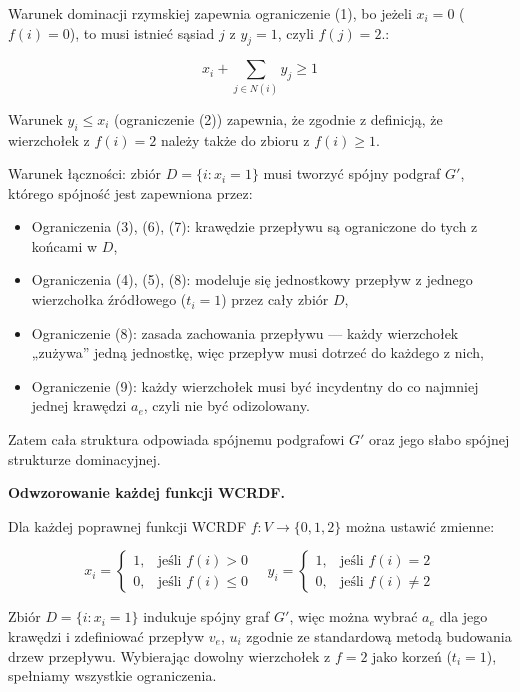 Warunek dominacji rzymskiej zapewnia ograniczenie (1), bo jeżeli \( x_i = 0 \) (\( f(i) = 0 \)), to musi istnieć sąsiad \( j \) z \( y_j = 1 \), czyli \( f(j) = 2 \).:

\[
x_i + \sum_{j \in N(i)} y_j \geq 1
\]

Warunek \( y_i \leq x_i \) (ograniczenie (2)) zapewnia, że zgodnie z definicją, że wierzchołek z \( f(i) = 2 \) należy także do zbioru z \( f(i) \geq 1 \).

Warunek łączności: zbiór \( D = \{i : x_i = 1\} \) musi tworzyć spójny podgraf \( G' \), którego spójność jest zapewniona przez:

\begin{itemize}
    \item Ograniczenia (3), (6), (7): krawędzie przepływu są ograniczone do tych z końcami w \( D \),
    \item Ograniczenia (4), (5), (8): modeluje się jednostkowy przepływ z jednego wierzchołka źródłowego ($t_i = 1$) przez cały zbiór \( D \),
    \item Ograniczenie (8): zasada zachowania przepływu — każdy wierzchołek „zużywa” jedną jednostkę, więc przepływ musi dotrzeć do każdego z nich,
    \item Ograniczenie (9): każdy wierzchołek musi być incydentny do co najmniej jednej krawędzi $a_e$, czyli nie być odizolowany.
\end{itemize}

Zatem cała struktura odpowiada spójnemu podgrafowi \( G' \) oraz jego słabo spójnej strukturze dominacyjnej.

\textbf{Odwzorowanie każdej funkcji WCRDF.}

Dla każdej poprawnej funkcji WCRDF \( f : V \to \{0,1,2\} \) można ustawić zmienne:

\[
x_i =
\begin{cases}
1, & \text{jeśli } f(i) > 0 \\
0, & \text{jeśli } f(i) \leq 0
\end{cases}
\quad
y_i =
\begin{cases}
1, & \text{jeśli } f(i) = 2 \\
0, & \text{jeśli } f(i) \ne 2 
\end{cases}
\]

Zbiór \( D = \{i : x_i = 1\} \) indukuje spójny graf \( G' \), więc można wybrać \( a_e \) dla jego krawędzi i zdefiniować przepływ \( v_e \), \( u_i \) zgodnie ze standardową metodą budowania drzew przepływu. Wybierając dowolny wierzchołek z \( f = 2 \) jako korzeń ($t_i = 1$), spełniamy wszystkie ograniczenia.

